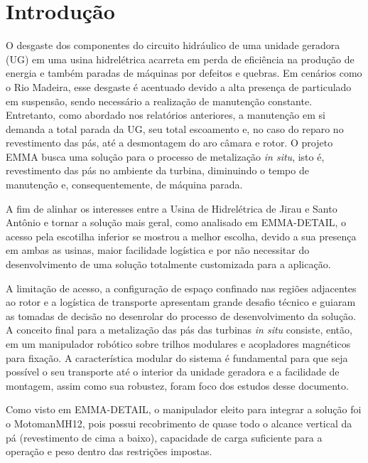 \section{Introdução}

O desgaste dos componentes do circuito hidráulico de uma unidade geradora (UG)
em uma usina hidrelétrica acarreta em perda de eficiência na produção de energia e
também paradas de máquinas por defeitos e quebras. Em cenários como o Rio
Madeira, esse desgaste é acentuado devido a alta presença de particulado em
suspensão, sendo necessário a realização de manutenção constante. Entretanto,
como abordado nos relatórios anteriores, a manutenção em si demanda a total
parada da UG, seu total escoamento e, no caso do reparo no revestimento das
pás, até a desmontagem do aro câmara e rotor. O projeto EMMA busca uma solução
para o processo de metalização \textit{in situ}, isto é, revestimento das pás no
ambiente da turbina, diminuindo o tempo de manutenção e, consequentemente, de
máquina parada.

A fim de alinhar os interesses entre a Usina de Hidrelétrica de Jirau e Santo
Antônio e tornar a solução mais geral, como analisado em EMMA-DETAIL, o acesso
pela escotilha inferior se mostrou a melhor escolha, devido a sua presença em
ambas as usinas, maior facilidade logística e por não necessitar do
desenvolvimento de uma solução totalmente customizada para a aplicação. 

A limitação de acesso, a configuração de espaço confinado nas regiões adjacentes
ao rotor e a logística de transporte apresentam grande desafio técnico e guiaram
as tomadas de decisão no desenrolar do processo de desenvolvimento da solução. A
conceito final para a metalização das pás das turbinas \textit{in situ}
consiste, então, em um manipulador robótico sobre trilhos modulares e
acopladores magnéticos para fixação. A característica modular do sistema é
fundamental para que seja possível o seu transporte até o interior da unidade
geradora e a facilidade de montagem, assim como sua robustez, foram foco dos
estudos desse documento. 

Como visto em EMMA-DETAIL, o manipulador eleito para integrar a solução foi o
Motoman\textregistered MH12, pois possui
recobrimento de quase todo o alcance vertical da pá (revestimento de cima a
baixo), capacidade de carga suficiente para a operação e peso dentro das
restrições impostas.
